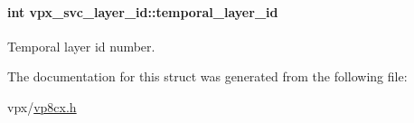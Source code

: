 \paragraph[{\texorpdfstring{temporal\+\_\+layer\+\_\+id}{temporal_layer_id}}]{\setlength{\rightskip}{0pt plus 5cm}int vpx\+\_\+svc\+\_\+layer\+\_\+id\+::temporal\+\_\+layer\+\_\+id}\hypertarget{structvpx__svc__layer__id_a365859e15e7a6ff2b06106ea00820ea7}{}\label{structvpx__svc__layer__id_a365859e15e7a6ff2b06106ea00820ea7}
Temporal layer id number. 

The documentation for this struct was generated from the following file\+:\begin{DoxyCompactItemize}
\item 
vpx/\hyperlink{vp8cx_8h}{vp8cx.\+h}\end{DoxyCompactItemize}
